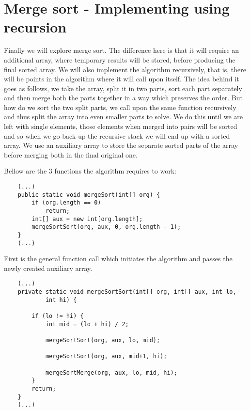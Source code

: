 \documentclass[a4paper,11pt]{article}
\begin{document}
\section*{Merge sort - Implementing using recursion}

Finally we will explore merge sort. The difference here is that it will require an additional array, where temporary results will be stored, before producing the final sorted array. We will also implement the algorithm recursively, that is, there will be points in the algorithm where it will call upon itself. The idea behind it goes as follows, we take the array, split it in two parts, sort each part separately and then merge both the parts together in a way which preserves the order. But how do we sort the two split parts, we call upon the same function recursively and thus split the array into even smaller parts to solve. We do this until we are left with single elements, those elements when merged into pairs will be sorted and so when we go back up the recursive stack we will end up with a sorted array. We use an auxiliary array to store the separate sorted parts of the array before merging both in the final original one.

Bellow are the 3 functions the algorithm requires to work:

\begin{verbatim}
    (...)
    public static void mergeSort(int[] org) {
        if (org.length == 0)
            return;
        int[] aux = new int[org.length];
        mergeSortSort(org, aux, 0, org.length - 1);
    }
    (...)
\end{verbatim}

First is the general function call which initiates the algorithm and passes the newly created auxiliary array.

\begin{verbatim}
    (...)
    private static void mergeSortSort(int[] org, int[] aux, int lo, 
            int hi) {
            
        if (lo != hi) {
            int mid = (lo + hi) / 2;
            
            mergeSortSort(org, aux, lo, mid);
            
            mergeSortSort(org, aux, mid+1, hi);
            
            mergeSortMerge(org, aux, lo, mid, hi);
        }
        return;
    }
    (...)
\end{verbatim}
\end{document}
